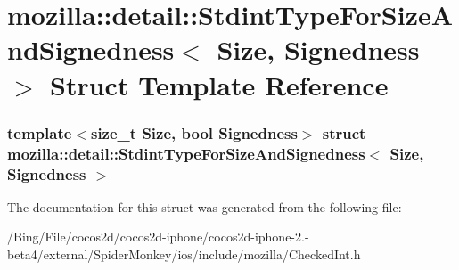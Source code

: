\hypertarget{structmozilla_1_1detail_1_1_stdint_type_for_size_and_signedness}{\section{mozilla\-:\-:detail\-:\-:Stdint\-Type\-For\-Size\-And\-Signedness$<$ Size, Signedness $>$ Struct Template Reference}
\label{structmozilla_1_1detail_1_1_stdint_type_for_size_and_signedness}
}
\subsubsection*{template$<$size\-\_\-t Size, bool Signedness$>$ struct mozilla\-::detail\-::\-Stdint\-Type\-For\-Size\-And\-Signedness$<$ Size, Signedness $>$}



The documentation for this struct was generated from the following file\-:\begin{DoxyCompactItemize}
\item 
/\-Bing/\-File/cocos2d/cocos2d-\/iphone/cocos2d-\/iphone-\/2.-\/beta4/external/\-Spider\-Monkey/ios/include/mozilla/Checked\-Int.\-h\end{DoxyCompactItemize}
